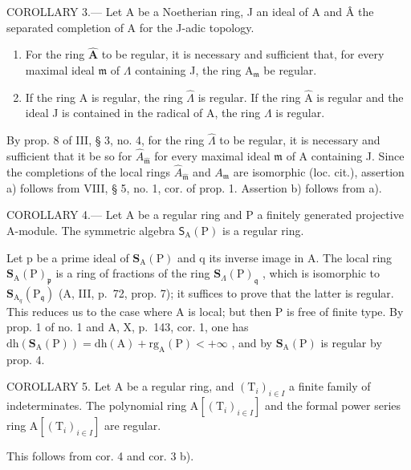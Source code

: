 COROLLARY 3.--- Let A be a Noetherian ring, J an ideal of A and Â the separated completion of A for the J-adic topology.

\begin{enumerate}
\def\labelenumi{\alph{enumi})}
\item
  For the ring \(\widehat{\mathbf{A}}\) to be regular, it is necessary and sufficient that, for every maximal ideal \(\mathfrak{m}\) of \(\Lambda\) containing J, the ring \(\mathrm{A}_{\mathfrak{m}}\) be regular.
\item
  If the ring A is regular, the ring \(\hat{\Lambda}\) is regular. If the ring \(\hat{\mathrm{A}}\) is regular and the ideal J is contained in the radical of A, the ring \(\Lambda\) is regular.
\end{enumerate}

By prop. 8 of III, § 3, no. 4, for the ring \(\widehat{\Lambda}\) to be regular, it is necessary and sufficient that it be so for \(\widehat{A}_{\widehat{\mathfrak{m}}}\) for every maximal ideal \(\mathfrak{m}\) of A containing J. Since the completions of the local rings \(\widehat{A}_{\widehat{\mathfrak{m}}}\) and \(A_{\mathfrak{m}}\) are isomorphic (loc. cit.), assertion a) follows from VIII, § 5, no. 1, cor. of prop. 1. Assertion b) follows from a).

COROLLARY 4.--- Let A be a regular ring and P a finitely generated projective A-module. The symmetric algebra \(\mathsf{S}_{\mathrm{A}}(\mathrm{P})\) is a regular ring.

Let p be a prime ideal of \(\mathbf{S}_{\mathrm{A}}(\mathrm{P})\) and q its inverse image in A. The local ring \(\mathbf{S}_{\mathrm{A}}(\mathrm{P})_{\mathfrak{p}}\) is a ring of fractions of the ring \(\mathbf{S}_{\Lambda}(\mathrm{P})_{\mathfrak{q}}\) , which is isomorphic to \(\mathbf{S}_{\mathrm{A}_{q}}(\mathrm{P}_{\mathfrak{q}})\) (A, III, p.~72, prop. 7); it suffices to prove that the latter is regular. This reduces us to the case where A is local; but then P is free of finite type. By prop. 1 of no. 1 and A, X, p.~143, cor. 1, one has \(\mathrm{dh}(\mathbf{S}_{\mathrm{A}}(\mathrm{P})) = \mathrm{dh}(\mathrm{A}) + \mathrm{rg}_{\mathrm{A}}(\mathrm{P}) < +\infty\) , and by \(\mathbf{S}_{\mathrm{A}}(\mathrm{P})\) is regular by prop. 4.

COROLLARY 5. Let A be a regular ring, and \((\mathrm{T}_i)_{i\in I}\) a finite family of indeterminates. The polynomial ring \(\mathrm{A}[(\mathrm{T}_i)_{i\in I}]\) and the formal power series ring \(\mathrm{A}[(\mathrm{T}_i)_{i\in I}]\) are regular.

This follows from cor. 4 and cor. 3 b).

